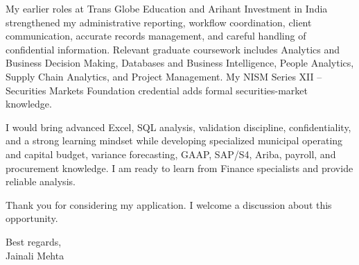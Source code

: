 \documentclass[letterpaper,10pt]{article}
\begin{document}
My earlier roles at Trans Globe Education and Arihant Investment in India strengthened my administrative reporting, workflow coordination, client communication, accurate records management, and careful handling of confidential information. Relevant graduate coursework includes Analytics and Business Decision Making, Databases and Business Intelligence, People Analytics, Supply Chain Analytics, and Project Management. My NISM Series XII -- Securities Markets Foundation credential adds formal securities-market knowledge.

I would bring advanced Excel, SQL analysis, validation discipline, confidentiality, and a strong learning mindset while developing specialized municipal operating and capital budget, variance forecasting, GAAP, SAP/S4, Ariba, payroll, and procurement knowledge. I am ready to learn from Finance specialists and provide reliable analysis.

Thank you for considering my application. I welcome a discussion about this opportunity.

Best regards,\\[8pt]
Jainali Mehta
\end{document}
